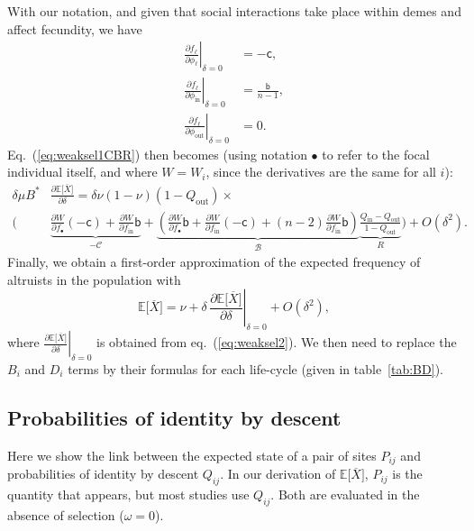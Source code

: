 \documentclass[11pt, letterpaper]{article}
\renewcommand{\eqref}[1]{\textup{{\normalfont eq.~(\ref{#1}}\normalfont)}}
\newcommand{\Eqref}[1]{Eq.~(\ref{#1})}
\newcommand{\deriv}[2]{\partial_{#2}\!{#1}\,}
\newcommand{\derivv}[3]{\left.\frac{\partial #1}{\partial #2}\right |_{#3=0}} %
\newcommand{\derivn}[2]{\frac{\partial #1}{\partial #2}}
\newcommand{\Esp}[1]{\mathbb{E}\big[ #1\big]}%
\newcommand{\bigO}[1]{O\left( #1 \right)}
\newcommand{\bb}{\mathsf{b}}
\newcommand{\cc}{\mathsf{c}}
\newcommand{\mutbias}{\nu}
\newcommand{\inn}{\textrm{in}}
\newcommand{\out}{\textrm{out}}
\newcommand{\focal}{\bullet}
\newcommand{\selstr}{\delta}
\begin{document}
With our notation, and given that social interactions take place within demes and affect fecundity, we have
\begin{subequations}\label{eq:derivf}
\begin{align}
\derivv{f_{\ell}}{\phi_{\ell}}{\delta} & = -\cc,\\
\derivv{f_{\ell}}{\phi_{\inn}}{\delta} & = \frac{\bb}{n-1},\\
\derivv{f_{\ell}}{\phi_{\out}}{\delta} & = 0.
\end{align}
\end{subequations}
%
\Eqref{eq:weaksel1CBR} then becomes (using notation $\focal$ to refer to the focal individual itself, and where $W=W_i$, since the derivatives are the same for all $i$):
%
\begin{equation}\label{eq:weaksel2}
\begin{split}
\selstr \mu B^* & \derivn{\Esp{\overline{X}}}{\selstr} = \selstr  \mutbias (1-\mutbias) (1 - Q_{\out}) \times \\
 \Bigg( &\underbrace{ \derivn{W}{f_{\focal}} (-\cc) + \derivn{W}{f_{\inn}} \bb}_{-\mathcal{C}} + \underbrace{ \left( \derivn{W}{f_{\focal}} \bb + \derivn{W}{f_{\inn}} (-\cc) + (n-2) \derivn{W}{f_{\inn}} \bb \right) }_{\mathcal{B}} \underbrace{\frac{Q_{\inn} - Q_{\out}}{1 - Q_{\out}}}_{R} \Bigg)  + \bigO{\selstr^2}.
\end{split}
\end{equation}
Finally, we obtain a first-order approximation of the expected frequency of altruists in the population with 
\begin{equation}\label{eq:EXgeneric}
\Esp{\overline{X}} = \mutbias + \selstr \,  \derivv{\Esp{\overline{X}}}{\selstr}{\selstr} + \bigO{\selstr^2},
\end{equation}
where $\derivv{\Esp{\overline{X}}}{\selstr}{\selstr}$ is obtained from \eqref{eq:weaksel2}. We then need to replace the $B_{i}$ and $D_{i}$ terms by their formulas for each life-cycle (given in table~\ref{tab:BD}).

\subsection{Probabilities of identity by descent\label{sec:app:IBD}}

Here we show the link between the expected state of a pair of sites $P_{ij}$ and probabilities of identity by descent $Q_{ij}$. In our derivation of $\Esp{\overline{X}}$, $P_{ij}$ is the quantity that appears, but most studies use $Q_{ij}$. Both are evaluated in the absence of selection ($\omega = 0$). 
\end{document}
